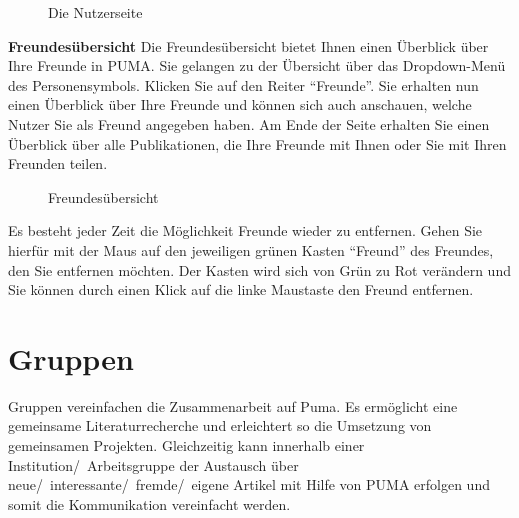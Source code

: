 \begin{figure}[h!]
 \centering
 \caption{Die Nutzerseite}
 \label{figure058}
\end{figure}
\textbf{Freundesübersicht} \newline
Die Freundesübersicht bietet Ihnen einen Überblick über Ihre Freunde in PUMA. Sie gelangen zu der Übersicht über das Dropdown-Menü des Personensymbols. Klicken Sie auf den Reiter \enquote{Freunde}. Sie erhalten nun einen Überblick über Ihre Freunde und können sich auch anschauen, welche Nutzer Sie als Freund angegeben haben. Am Ende der Seite erhalten Sie einen Überblick über alle Publikationen, die Ihre Freunde mit Ihnen oder Sie mit Ihren Freunden teilen.\newline
\begin{figure}[h!]
 \centering
 \caption{Freundesübersicht}
 \label{figure059}
\end{figure}
Es besteht jeder Zeit die Möglichkeit Freunde wieder zu entfernen. Gehen Sie hierfür mit der Maus auf den jeweiligen grünen Kasten \enquote{Freund} des Freundes, den Sie entfernen möchten. Der Kasten wird sich von Grün zu Rot verändern und Sie können durch einen Klick auf die linke Maustaste den Freund entfernen. 
\section{Gruppen}
Gruppen vereinfachen die Zusammenarbeit auf Puma. Es ermöglicht eine gemeinsame Literaturrecherche und erleichtert so die Umsetzung von gemeinsamen Projekten. Gleichzeitig kann innerhalb einer Institution/~Arbeitsgruppe der Austausch über neue/~interessante/~fremde/~eigene Artikel mit Hilfe von PUMA erfolgen und somit die Kommunikation vereinfacht werden. 
